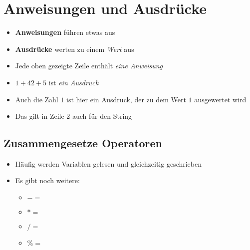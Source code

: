 \section{Anweisungen und Ausdrücke}
\begin{frame}
	\slidehead
	\begin{itemize}
		\item \textbf{Anweisungen} führen etwas aus
		\item \textbf{Ausdrücke} werten zu einem \textit{Wert} aus
	\end{itemize}
	\pause
	\begin{itemize}
		\item Jede oben gezeigte Zeile enthält \textit{eine Anweisung}
		\item $1 + 42 + 5$ ist \textit{ein Ausdruck}
		\pause
		\item Auch die Zahl $1$ ist hier ein Ausdruck, der zu dem Wert $1$ ausgewertet wird
		\item Das gilt in Zeile 2 auch für den String
	\end{itemize}

\end{frame}




\subsection{Zusammengesetze Operatoren}
\begin{frame}
	\slidehead

	\begin{itemize}
		\item Häufig werden Variablen gelesen und gleichzeitig geschrieben
	\end{itemize}


	\begin{itemize}
		\item Es gibt noch weitere:
		\begin{itemize}
			\item $-=$
			\item $*=$
			\item $/=$
			\item $\%=$
		\end{itemize}
	\end{itemize}
\end{frame}

\livecoding

